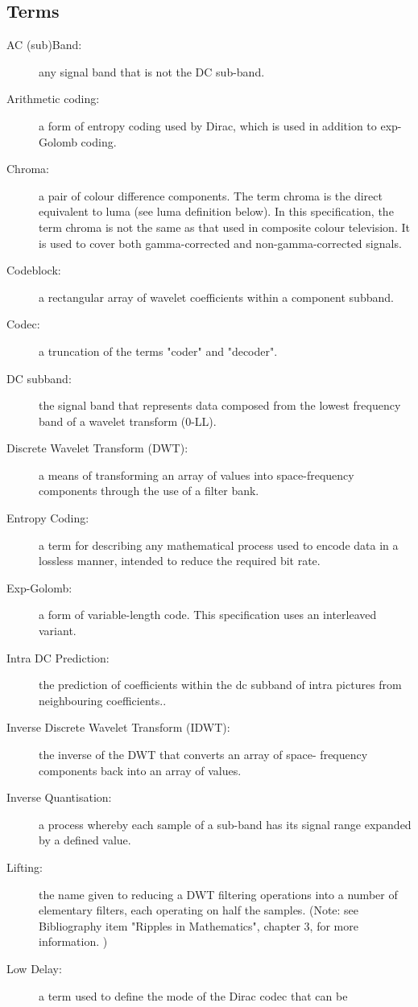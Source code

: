 \subsection{Terms}
\begin{description}
\item[AC (sub)Band:] any signal band that is not the DC sub-band.
\item[Arithmetic coding:] a form of entropy coding used by Dirac, which is used
 in addition to exp-Golomb coding.
\item[Chroma:] a pair of colour difference components. The term chroma is the 
direct equivalent to luma (see luma definition below). In this specification, 
the term chroma is not the same as that used in composite colour television. It 
is used to cover both gamma-corrected and non-gamma-corrected signals.
\item[Codeblock:] a rectangular array of wavelet coefficients within a component
 subband.
\item[Codec:] a truncation of the terms "coder" and "decoder".
\item[DC subband:] the signal band that represents data composed from the lowest
 frequency band of a wavelet transform (0-LL).
\item[Discrete Wavelet Transform (DWT):] a means of transforming an array of 
values into space-frequency components through the use of a filter bank. 
\item[Entropy Coding:] a term for describing any mathematical process used to 
encode data in a lossless manner, intended to reduce the required bit rate.
\item[Exp-Golomb:] a form of variable-length code. This specification uses an 
interleaved variant.
\item[Intra DC Prediction:] the prediction of coefficients within the dc subband
 of intra pictures from neighbouring coefficients..
\item[Inverse Discrete Wavelet Transform (IDWT):] the inverse of the DWT that 
converts an array of space- frequency components back into an array of values.
\item[Inverse Quantisation:] a process whereby each sample of a sub-band has 
its signal range expanded by a defined value.
\item[Lifting:] the name given to reducing a DWT filtering operations into a 
number of elementary
filters, each operating on half the samples.
	(Note: see Bibliography item "Ripples in Mathematics", chapter 3, for 
more information. )
\item[Low Delay:] a term used to define the mode of the Dirac codec that can be 

\end{description}
